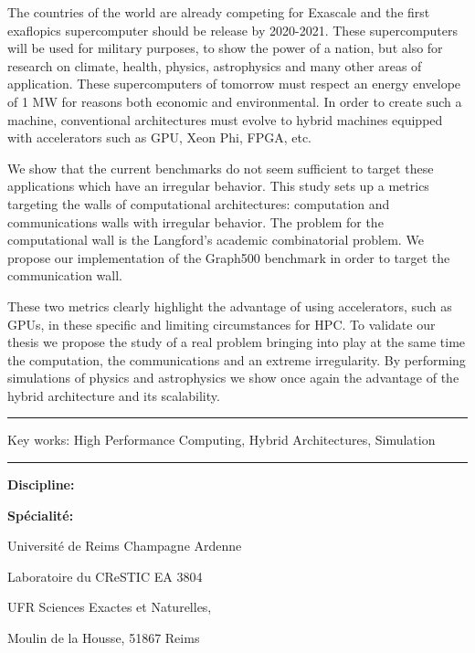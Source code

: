 The countries of the world are already competing for Exascale and the first exaflopics supercomputer should be release by 2020-2021.
These supercomputers will be used for military purposes, to show the power of a nation, but also for research on climate, health, physics, astrophysics and many other areas of application.
These supercomputers of tomorrow must respect an energy envelope of 1 MW for reasons both economic and environmental.
In order to create such a machine, conventional architectures must evolve to hybrid machines equipped with accelerators such as GPU, Xeon Phi, FPGA, etc.

We show that the current benchmarks do not seem sufficient to target these applications which have an irregular behavior.
This study sets up a metrics targeting the walls of computational architectures: computation and communications walls with irregular behavior.
The problem for the computational wall is the Langford's academic combinatorial problem.
We propose our implementation of the Graph500 benchmark in order to target the communication wall.

These two metrics clearly highlight the advantage of using accelerators, such as GPUs, in these specific and limiting circumstances for HPC.
To validate our thesis we propose the study of a real problem bringing into play at the same time the computation, the communications and an extreme irregularity.
By performing simulations of physics and astrophysics we show once again the advantage of the hybrid architecture and its scalability.

\vspace{.3cm}
\hrule
\vspace{.1cm}

{
\small
Key works: High Performance Computing, Hybrid Architectures, Simulation
}

\vspace{.1cm}
\hrule

\vspace{.3cm}
\textbf{Discipline: \phdDiscipline}

\textbf{Spécialité: \phdSpeciality}
\vspace{.2cm}

\hspace{8cm}Université de Reims Champagne Ardenne

\hspace{8cm}Laboratoire du CReSTIC EA 3804

\hspace{8cm}UFR Sciences Exactes et Naturelles, 

\hspace{8cm}Moulin de la Housse, 51867 Reims

